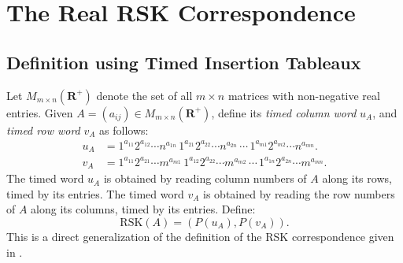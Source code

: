 \documentclass[10pt]{amsproc}
\theoremstyle{definition}
\theoremstyle{remark}
\newcommand{\rp}{\mathbf{R}^+}
\newcommand{\rsk}{\mathrm{RSK}}
\begin{document}
\section{The Real RSK Correspondence}
\label{sec:rsk}
\subsection{Definition using Timed Insertion Tableaux}
\label{sec:defin-using-timed}
Let $M_{m\times n}(\rp)$ denote the set of all $m\times n$ matrices with non-negative real entries.
Given $A=(a_{ij})\in M_{m\times n}(\rp)$, define its \emph{timed column word} $u_A$, and \emph{timed row word} $v_A$ as follows:
\begin{align*}
  u_A & = 1^{a_{11}}2^{a_{12}}\dotsb n^{a_{1n}}\,1^{a_{21}}2^{a_{22}}\dotsb n^{a_{2n}}\,\dotsb \,1^{a_{m1}}2^{a_{m2}}\dotsb n^{a_{mn}}.\\
  v_A & = 1^{a_{11}}2^{a_{21}}\dotsb m^{a_{m1}}\,1^{a_{12}}2^{a_{22}}\dotsb m^{a_{m2}}\,\dotsb \,1^{a_{1n}}2^{a_{2n}}\dotsb m^{a_{mn}}.
\end{align*}
The timed word $u_A$ is obtained by reading column numbers of $A$ along its rows, timed by its entries.
The timed word $v_A$ is obtained by reading the row numbers of $A$ along its columns, timed by its entries.
Define:
\begin{equation}
  \label{eq:rsk}
  \rsk(A) = (P(u_A), P(v_A)).
\end{equation}
This is a direct generalization of the definition of the RSK correspondence given in \cite[Section~18]{schur_poly}.
\end{document}
